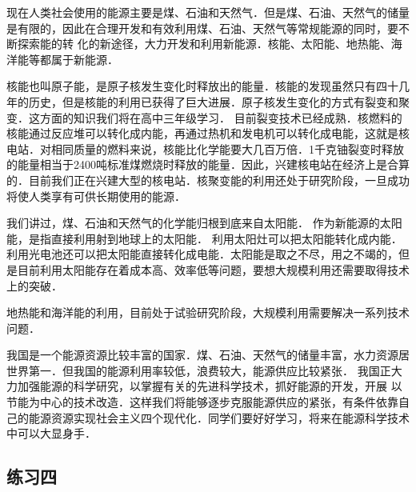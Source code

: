 现在人类社会使用的能源主要是煤、石油和天然气．但是煤、石油、天然气的储量是有限的，因此在合理开发和有效利用煤、石油、天然气等常规能源的同时，要不断探索能的转
化的新途径，大力开发和利用新能源．核能、太阳能、地热能、海洋能等都属于新能源．

核能也叫原子能，是原子核发生变化时释放出的能量．核能的发现虽然只有四十几年的历史，但是核能的利用已获得了巨大进展．原子核发生变化的方式有裂变和聚变．这方面的知识我们将在高中三年级学习．
目前裂变技术已经成熟．核燃料的核能通过反应堆可以转化成内能，再通过热机和发电机可以转化成电能，这就是核电站．对相同质量的燃料来说，核能比化学能要大几百万倍．1千克铀裂变时释放的能量相当于2400吨标准煤燃烧时释放的能量．因此，兴建核电站在经济上是合算的．目前我们正在兴建大型的核电站．核聚变能的利用还处于研究阶段，一旦成功将使人类享有可供长期使用的能源．

我们讲过，煤、石油和天然气的化学能归根到底来自太阳能．
作为新能源的太阳能，是指直接利用射到地球上的太阳能．
利用太阳灶可以把太阳能转化成内能．利用光电池还可以把太阳能直接转化成电能．太阳能是取之不尽，用之不竭的，但是目前利用太阳能存在着成本高、效率低等问题，要想大规模利用还需要取得技术上的突破．

地热能和海洋能的利用，目前处于试验研究阶段，大规模利用需要解决一系列技术问题．

我国是一个能源资源比较丰富的国家．煤、石油、天然气的储量丰富，水力资源居世界第一．但我国的能源利用率较低，浪费较大，能源供应比较紧张．
我国正大力加强能源的科学研究，以掌握有关的先进科学技术，抓好能源的开发，开展
以节能为中心的技术改造．这样我们将能够逐步克服能源供应的紧张，有条件依靠自己的能源资源实现社会主义四个现代化．同学们要好好学习，将来在能源科学技术中可以大显身手．

\subsection*{练习四}


